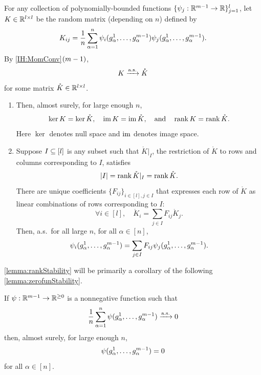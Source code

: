\documentclass[main.tex]{subfiles}
\begin{document}
\begin{lemma}\label{lemma:rankStability}
For any collection of polynomially-bounded functions $\{\psi_j: \mathbb{R}^{m-1} \to \mathbb{R}\}_{j=1}^l$, let $K \in \mathbb{R}^{l \times l}$ be the random matrix (depending on $n$) defined by
\begin{equation*}
K_{ij} = \frac{1}{n} \sum_{\alpha=1}^n \psi_i(g^1_\alpha, \ldots, g^{m-1}_\alpha) \psi_j(g^1_\alpha, \ldots, g^{m-1}_\alpha).
\end{equation*}
By \ref{IH:MomConv}$(m-1)$,
\[K \xrightarrow{\mathrm{a.s.}} \mathring K\]
for some matrix $\mathring K \in \mathbb{R}^{l \times l}$.
\begin{enumerate}
\item
    Then, almost surely, for large enough $n$,
    \begin{equation*}
    \ker K = \ker \mathring K, \quad \operatorname{im} K = \operatorname{im} \mathring K, \quad\text{and}\quad \operatorname{rank} K = \operatorname{rank} \mathring K.
    \end{equation*}
    Here $\ker$ denotes null space and $\operatorname{im}$ denotes image space.
\item
    Suppose $I \subseteq [l]$ is any subset such that $\mathring K|_I$, the restriction of $\mathring K$ to rows and columns corresponding to $I$, satisfies
    \[|I| = \operatorname{rank} \mathring K|_I = \operatorname{rank} \mathring K.\]
    There are unique coefficients $\{F_{ij}\}_{i \in [l], j \in I}$ that expresses each row of $\mathring K$ as linear combinations of rows corresponding to $I$:
    \[
    \forall i \in [l],\quad 
    \mathring K_i = \sum_{j \in I} F_{ij} \mathring K_j.
    \]
    Then, a.s.\ for all large $n$, for all $\alpha \in [n]$,
    \begin{equation*}
    \psi_i(g^1_\alpha, \ldots, g^{m-1}_\alpha)
    = \sum_{j \in I} F_{ij} \psi_j(g^1_\alpha, \ldots, g^{m-1}_\alpha).
    \end{equation*}
\end{enumerate}

\end{lemma}

\cref{lemma:rankStability} will be primarily a corollary of the following \cref{lemma:zerofunStability}.

\begin{lemma}\label{lemma:zerofunStability}
If $\psi: \mathbb{R}^{m-1} \to \mathbb{R}^{\ge 0}$ is a nonnegative function such that
\begin{align*}
\frac{1}{n} \sum_{\alpha = 1}^n \psi(g^1_\alpha, \ldots, g^{m-1}_\alpha) \xrightarrow{\mathrm{a.s.}} 0
\end{align*}
then, almost surely, for large enough $n$,
\[\psi(g^1_\alpha, \ldots, g^{m-1}_\alpha) = 0\]
for all $\alpha \in [n]$.
\end{lemma}
\end{document}
